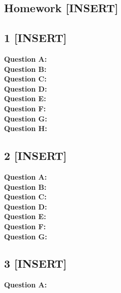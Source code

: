 \documentclass[12 pt]{article}
\begin{document}
	\begin{center}
		\section*{Homework [INSERT]}
	\end{center}
	
	
	\subsection*{1 [INSERT]}	
	\noindent\textbf{Question A:}  \\
	
	\noindent\textbf{Question B:}  \\
	
	\noindent\textbf{Question C:}  \\
	
	\noindent\textbf{Question D:}  \\
	
	\noindent\textbf{Question E:}  \\
	
	\noindent\textbf{Question F:}  \\
	
	\noindent\textbf{Question G:} \\
	
	\noindent\textbf{Question H:} 
 
	
	\subsection*{2 [INSERT]}
	\noindent\textbf{Question A:} \\
	
	\noindent\textbf{Question B:} \\

	
	\noindent\textbf{Question C:}  \\
	
	\noindent\textbf{Question D:} \\
	
	\noindent\textbf{Question E:} \\
	
	\noindent\textbf{Question F:} \\
	
	\noindent\textbf{Question G:} 
	
	\subsection*{3 [INSERT]}
	\noindent\textbf{Question A:} \\
\end{document}
